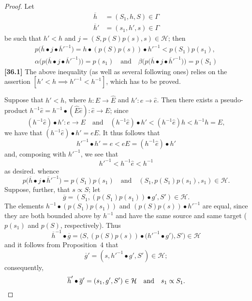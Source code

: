 \documentclass[a4paper,fleqn]{article}
\theoremstyle{plain}
\theoremstyle{definition}
\newenvironment{longcomm}[1]
  {\noindent\textbf{[#1]}\rmfamily}
  {}
\newcommand{\oldpage}[1]{{\marginpar{\footnotesize$\bigg\vert$\,\,\,\,\textit{p.~#1}}}}
\newcommand{\textand}{\quad\text{and}\quad}
\newcommand{\HH}{\mathcal{H}}
\newcommand{\subs}{\mathrel{\propto}}
\newcommand{\smallbullet}{\bullet}
\begin{document}
\begin{proof}
  \oldpage{364}
  Let
  \[
    \begin{aligned}
      \overline{h}
      &= (S_1,h,S)\in\Gamma
    \\\overline{h}'
      &= (s_1,h',s)\in\Gamma
    \end{aligned}
  \]
  be such that $h'<h$ and $j=(S,p(S)p(s),s)\in\HH$;
  then
  \[
    \begin{gathered}
      p\big(\overline{h}\smallbullet j\smallbullet \overline{h}'^{-1}\big)
      = h\smallbullet(p(S)p(s))\smallbullet h'^{-1}
      < p(S_1)p(s_1),
    \\\alpha\big(p\big(\overline{h}\smallbullet j\smallbullet\overline{h}'^{-1}\big)\big)
      = p(s_1)
      \textand
      \beta\big(p\big(\overline{h}\smallbullet j\smallbullet\overline{h}'^{-1}\big)\big)
      = p(S_1)
    \end{gathered}
  \]
  \begin{longcomm}{36.1}
    The above inequality (as well as several following ones) relies on the assertion $[h'<h\implies {h'}^{-1}<h^{-1}]$, which has to be proved.

    Suppose that $h'<h$, where $h\colon E\to\hat{E}$ and $h'\colon e\to\hat{e}$.
    Then there exists a pseudo-product $h^{-1}\hat{e}=h^{-1}\smallbullet(\hat{E}\hat{e})\colon\hat{e}\to E$;
    since
    \[
      (h^{-1}\hat{e})\smallbullet h'\colon e\to E
      \textand
      (h^{-1}\hat{e})\smallbullet h'
      < (h^{-1}\hat{e})h
      < h^{-1}h
      = E,
    \]
    we have that $(h^{-1}\hat{e})\smallbullet h'=eE$.
    It thus follows that
    \[
      {h'}^{-1}\smallbullet h'
      = e
      < eE
      = (h^{-1}\hat{e})\smallbullet h'
    \]
    and, composing with ${h'}^{-1}$, we see that
    \[
      {h'}^{-1}
      < h^{-1}\hat{e}
      < h^{-1}
    \]
    as desired.
  \end{longcomm}
  whence
  \[
    p\big(\overline{h}\smallbullet j\smallbullet\overline{h}'^{-1}\big)
    = p(S_1)p(s_1)
    \textand
    (S_1,p(S_1)p(s_1),s_1)
    \in\HH.
  \]
  Suppose, further, that $s\subs S$;
  let
  \[
    \overline{g}
    = (S_1,(p(S_1)p(s_1))\smallbullet g',S')
    \in\HH.
  \]
  The elements $h^{-1}\smallbullet(p(S_1)p(s_1))$ and $(p(S)p(s))\smallbullet h'^{-1}$ are equal, since they are both bounded above by $h^{-1}$ and have the same source and same target ($p(s_1)$ and $p(S)$, respectively).
  Thus
  \[
    \overline{h}^{-1}\smallbullet\overline{g}
    = \big(S,(p(S)p(s))\smallbullet\big( h'^{-1}\smallbullet g'\big),S'\big)
    \in\HH
  \]
  and it follows from Proposition~4 that
  \[
    \overline{g}'
    = (s,h'^{-1}\smallbullet g',S')
    \in\HH;
  \]
  consequently,
  \[
    \overline{h}'\smallbullet\overline{g}'
    = (s_1,g',S')
    \in\HH
    \textand
    s_1\subs S_1.
    \qedhere
  \]
\end{proof}
\end{document}
